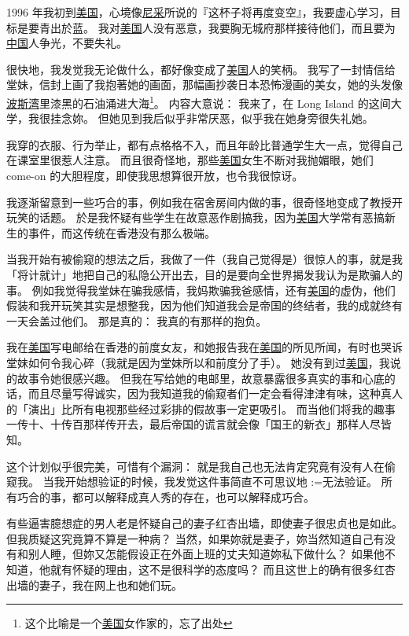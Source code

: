 \documentclass[12pt]{report}
\makeatletter
\renewcommand{\d}[1]{$\underaccent{\scalebox{0.5}{\textbullet}}{\textrm{#1}}$}
\newcommand{\ds}[1]{%
  \@tfor\next:=#1\do{\d{\next}}}
\makeatother
\begin{document}
1996 年我初到\uline{美国}，心境像\uline{尼采}所说的『这杯子将再度变空』，我要虚心学习，目标是要青出於蓝。 我对\uline{美国}人没有恶意，我要胸无城府那样接待他们，而且要为\uline{中国}人争光，不要失礼。

很快地，我发觉我无论做什么，都好像变成了\uline{美国}人的笑柄。 我写了一封情信给堂妹，信封上画了我抱著她的画面，那幅画抄袭日本恐怖漫画的美女，她的头发像\uline{波斯湾}里漆黑的石油涌进大海\footnote{这个比喻是一个\uline{美国}女作家的，忘了出处}。 内容大意说： 我来了，在 Long Island 的这间大学，我很挂念妳。 但她见到我后似乎非常厌恶，似乎我在她身旁很失礼她。

我穿的衣服、行为举止，都有点格格不入，而且年龄比普通学生大一点，觉得自己在课室里很惹人注意。 而且很奇怪地，那些\uline{美国}女生不断对我抛媚眼，她们 come-on 的大胆程度，即使我思想算很开放，也令我很惊讶。

我逐渐留意到一些巧合的事，例如我在宿舍房间内做的事，很奇怪地变成了教授开玩笑的话题。 於是我怀疑有些学生在故意恶作剧搞我，因为\uline{美国}大学常有恶搞新生的事件，而这传统在香港没有那么极端。

当我开始有被偷窥的想法之后，我做了一件（我自己觉得是）很惊人的事，就是我「将计就计」地把自己的私隐公开出去，目的是要向全世界揭发我认为是欺骗人的事。  例如我觉得我堂妹在骗我感情，我妈欺骗我爸感情，还有\uline{美国}的虚伪，他们假装和我开玩笑其实是想整我，因为他们知道我会是帝国的终结者，我的成就终有一天会盖过他们。 那是真的： 我真的有那样的抱负。

我在\uline{美国}写电邮给在香港的前度女友，和她报告我在\uline{美国}的所见所闻，有时也哭诉堂妹如何令我心碎（我就是因为堂妹所以和前度分了手）。  她没有到过\uline{美国}，我说的故事令她很感兴趣。  但我在写给她的电邮里，故意暴露很多真实的事和心底的话，而且尽量写得诚实，因为我知道我的偷窥者们一定会看得津津有味，这种真人的「演出」比所有电视那些经过彩排的假故事一定更吸引。  而当他们将我的趣事一传十、十传百那样传开去，最后帝国的谎言就会像「国王的新衣」那样人尽皆知。

这个计划似乎很完美，可惜有个漏洞： 就是我自己也无法肯定究竟有没有人在偷窥我。 当我开始想验证的时候，我发觉这件事简直不可思议地\ds{无法验证}。  所有巧合的事，都可以解释成真人秀的存在，也可以解释成巧合。

有些逼害臆想症的男人老是怀疑自己的妻子红杏出墙，即使妻子很忠贞也是如此。 但我质疑这究竟算不算是一种病？ 当然，如果妳就是妻子，妳当然知道自己有没有和别人睡，但妳又怎能假设正在外面上班的丈夫知道妳私下做什么？  如果他不知道，他就有怀疑的理由，这不是很科学的态度吗？  而且这世上的确有很多红杏出墙的妻子，我在网上也和她们玩。
\end{document}
